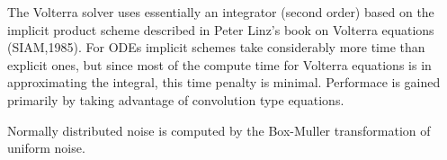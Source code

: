The Volterra solver uses essentially an integrator (second order)
based on the implicit product scheme described in Peter Linz's book on
Volterra equations (SIAM,1985). For ODEs implicit schemes take
considerably more time than explicit ones, but since most of the
compute time for Volterra equations is in approximating the integral,
this time penalty is minimal.  Performace is gained primarily by
taking advantage of convolution type equations.

Normally distributed noise is computed by the Box-Muller
transformation of uniform noise.  














